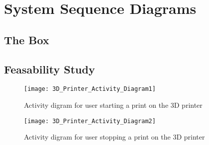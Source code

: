 \chapter{System Sequence Diagrams}

\section{The Box}
\section{Feasability Study}
\begin{figure}[H]
\texttt{[image: 3D\_Printer\_Activity\_Diagram1]}
\caption{\label{figure:3D_Printer_Activity_Diagram1} Activity digram for user starting a print on the 3D printer}
\end{figure}

\begin{figure}[H]
\texttt{[image: 3D\_Printer\_Activity\_Diagram2]}
\caption{\label{figure:3D_Printer_Activity_Diagram1} Activity digram for user stopping a print on the 3D printer}
\end{figure}